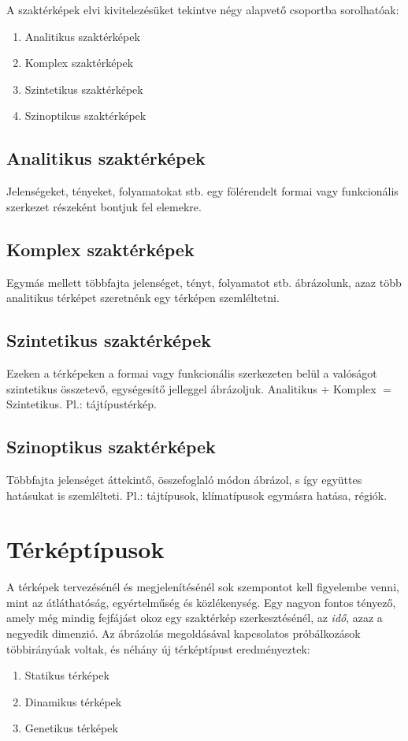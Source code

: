 	A szaktérképek elvi kivitelezésüket tekintve négy alapvető csoportba sorolhatóak:
	\begin{enumerate}
		\item Analitikus szaktérképek
		\item Komplex szaktérképek
		\item Szintetikus szaktérképek
		\item Szinoptikus szaktérképek
	\end{enumerate}
		
	\subsection{Analitikus szaktérképek}
	Jelenségeket, tényeket, folyamatokat stb. egy fölérendelt formai vagy funkcionális szerkezet részeként bontjuk fel
	elemekre.
	
	\subsection{Komplex szaktérképek}
	Egymás mellett többfajta jelenséget, tényt, folyamatot stb. ábrázolunk, azaz több analitikus térképet szeretnénk
	egy térképen szemléltetni.
	
	\subsection{Szintetikus szaktérképek}
	Ezeken a térképeken a formai vagy funkcionális szerkezeten belül a valóságot szintetikus összetevő, egységesítő
	jelleggel ábrázoljuk. Analitikus $+$ Komplex  $=$ Szintetikus. Pl.: tájtípustérkép.
	
	\subsection{Szinoptikus szaktérképek}
	Többfajta jelenséget áttekintő, összefoglaló módon ábrázol, s így együttes hatásukat is szemlélteti. 
	Pl.: tájtípusok, klímatípusok egymásra hatása, régiók.
		
	\section{Térképtípusok}
	A térképek tervezésénél és megjelenítésénél sok szempontot kell figyelembe venni, mint az átláthatóság, egyértelműség
	és közlékenység. Egy nagyon fontos tényező, amely még mindig fejfájást okoz egy szaktérkép szerkesztésénél, az 
	\emph{idő}, azaz a negyedik dimenzió. Az ábrázolás megoldásával kapcsolatos próbálkozások többirányúak voltak, és 
	néhány új térképtípust eredményeztek:
	\begin{enumerate}
		\item Statikus térképek
		\item Dinamikus térképek
		\item Genetikus térképek
	\end{enumerate}
	
